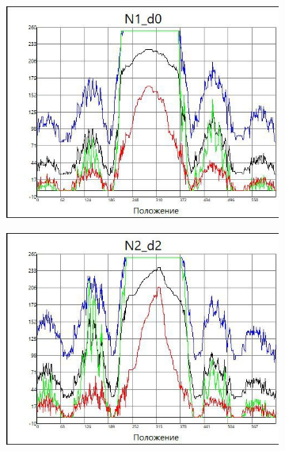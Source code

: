 \begin{figure}[h]
    \begin{subfigure}{.5\textwidth}
        \centering
        \includegraphics[trim={0 0 0 0},clip,width=\textwidth]{Ex_1/n1.jpg}
        \caption{}
        \label{n1}
    \end{subfigure}
    \begin{subfigure}{.5\textwidth}
        \centering
        \includegraphics[trim={0 0 0 0},clip,width=\textwidth]{Ex_1/n2.jpg}
        \caption{}
        \label{n2}
    \end{subfigure}\\
    \begin{subfigure}{.5\textwidth}

\end{subfigure}
\end{figure}
